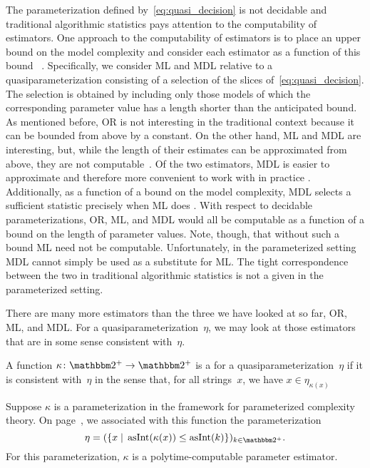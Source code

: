 The parameterization defined by~\eqref{eq:quasi_decision} is not decidable and traditional algorithmic statistics pays attention to the computability of estimators.
One approach to the computability of estimators is to place an upper bound on the model complexity and consider each estimator as a function of this bound~\parencite{gacs2001algorithmic,vereshchagin2004kolmogorov} \parencite[in the presence of resource bounds,][]{milovanov2017algorithmic}.
Specifically, we consider ML and MDL relative to a quasiparameterization consisting of a selection of the slices of~\eqref{eq:quasi_decision}.
The selection is obtained by including only those models of which the corresponding parameter value has a length shorter than the anticipated bound.
As mentioned before, OR is not interesting in the traditional context because it can be bounded from above by a constant.
On the other hand, ML and MDL are interesting, but, while the length of their estimates can be approximated from above, they are not computable~\parencite{vereshchagin2004kolmogorov}.
Of the two estimators, MDL is easier to approximate and therefore more convenient to work with in practice \parencite[Section~V.B]{vereshchagin2004kolmogorov}.
Additionally, as a function of a bound on the model complexity, MDL selects a sufficient statistic precisely when ML does \parencite[Lemma~IV.2]{vereshchagin2004kolmogorov}.
With respect to decidable parameterizations, OR, ML, and MDL would all be computable as a function of a bound on the length of parameter values.
Note, though, that without such a bound ML need not be computable.
Unfortunately, in the parameterized setting MDL cannot simply be used as a substitute for ML.
The tight correspondence between the two in traditional algorithmic statistics is not a given in the parameterized setting.

There are many more estimators than the three we have looked at so far, OR, ML, and MDL.
For a quasiparameterization~$\eta$, we may look at those estimators that are in some sense consistent with~$\eta$.
\begin{definition}
  A function $\kappa\colon \binary^+ \to \binary^+$ is a  for a quasiparameterization~$\eta$ if it is consistent with~$\eta$ in the sense that, for all strings~$x$, we have $x \in \eta_{\kappa(x)}$
\end{definition}
\begin{example}
  Suppose $\kappa$ is a parameterization in the \citeauthor{flum2006parameterized} framework for parameterized complexity theory.
  On page~\pageref{eq:flum_parameterization}, we associated with this function the parameterization
  \begin{equation*}
    \eta \deq (\{x \st \asNat(\kappa(x)) \le \asNat(k)\})_{k \in \binary^+}.
  \end{equation*}
  For this parameterization, $\kappa$ is a polytime-computable parameter estimator.
\end{example}

